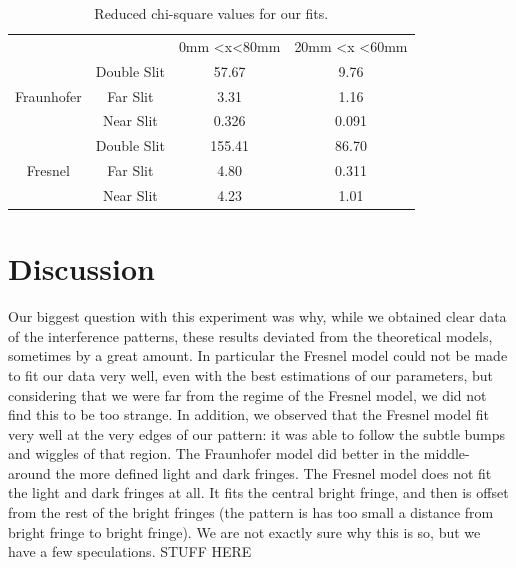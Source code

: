 \documentclass[prb,preprint]{revtex4-1}
\begin{document}
\begin{table}[h!]
\centering
\caption{Reduced chi-square values for our fits. }
\begin{ruledtabular}
\begin{tabular}{cccc}
                            &             & 0mm \textless x\textless 80mm & 20mm \textless x \textless 60mm \\
\multirow{3}{*}{Fraunhofer} & Double Slit &57.67                      & 9.76                         \\
                            & Far Slit    & 3.31                       & 1.16                        \\
                            & Near Slit   & 0.326                       &        0.091           \\
\multirow{3}{*}{Fresnel}    & Double Slit &          155.41               & 86.70                         \\
                            & Far Slit    & 4.80                       & 0.311                         \\
                            & Near Slit   & 4.23                       &1.01                       
\end{tabular}
\end{ruledtabular}
\label{chi-square}
\end{table}


\section{Discussion}

Our biggest question with this experiment was why, while we obtained clear data of the interference patterns, these results deviated from the theoretical models, sometimes by a great amount.  In particular the Fresnel model could not be made to fit our data very well, even with the best estimations of our parameters, but considering that we were far from the regime of the Fresnel model, we did not find this to be too strange. In addition, we observed that the Fresnel model fit very well at the very edges of our pattern:  it was able to follow the subtle bumps and wiggles of that region.  The Fraunhofer model did better in the middle- around the more defined light and dark fringes.  The Fresnel model does not fit the light and dark fringes at all.  It fits the central bright fringe, and then is offset from the rest of the bright fringes (the pattern is has too small a distance from bright fringe to bright fringe).  We are not exactly sure why this is so, but we have a few speculations.  STUFF HERE
\end{document}
